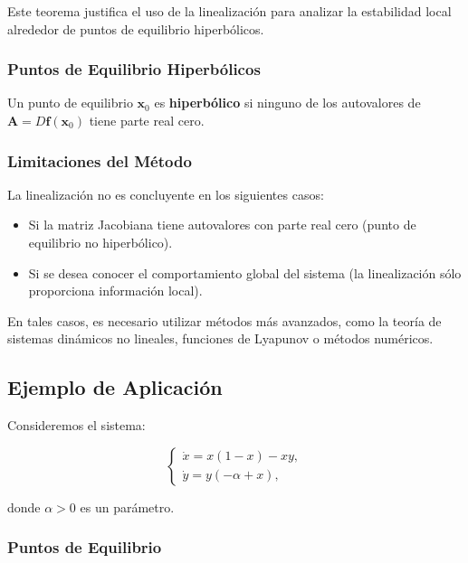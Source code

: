 Este teorema justifica el uso de la linealización para analizar la estabilidad local alrededor de puntos de equilibrio hiperbólicos.

\subsubsection{Puntos de Equilibrio Hiperbólicos}

Un punto de equilibrio $\mathbf{x}_0$ es \textbf{hiperbólico} si ninguno de los autovalores de $\mathbf{A} = D\mathbf{f}(\mathbf{x}_0)$ tiene parte real cero.

\subsubsection{Limitaciones del Método}

La linealización no es concluyente en los siguientes casos:

\begin{itemize}
    \item Si la matriz Jacobiana tiene autovalores con parte real cero (punto de equilibrio no hiperbólico).
    \item Si se desea conocer el comportamiento global del sistema (la linealización sólo proporciona información local).
\end{itemize}

En tales casos, es necesario utilizar métodos más avanzados, como la teoría de sistemas dinámicos no lineales, funciones de Lyapunov o métodos numéricos.

\subsection{Ejemplo de Aplicación}

Consideremos el sistema:

\begin{equation}\label{eq:ejemplo_sistema}
    \begin{cases}
        \dot{x} = x (1 - x) - xy, \\
        \dot{y} = y (-\alpha + x),
    \end{cases}
\end{equation}

donde $\alpha > 0$ es un parámetro.

\subsubsection{Puntos de Equilibrio}

